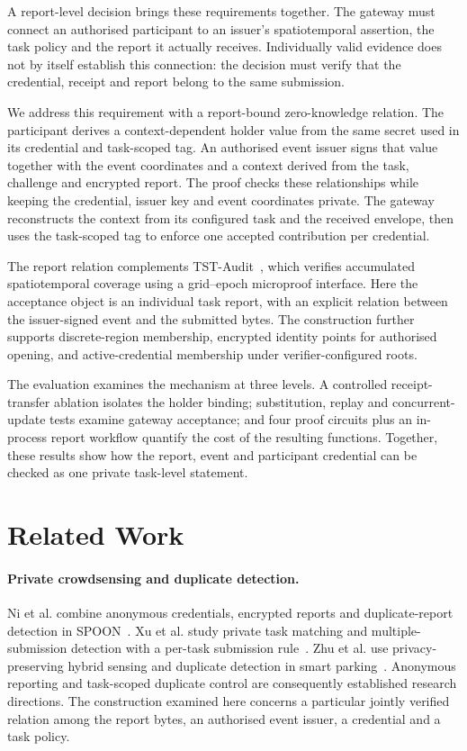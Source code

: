 \documentclass[pdflatex,iicol,sn-mathphys-num]{sn-jnl}
\begin{document}
A report-level decision brings these requirements together. The gateway must connect an authorised participant to an issuer's spatiotemporal assertion, the task policy and the report it actually receives. Individually valid evidence does not by itself establish this connection: the decision must verify that the credential, receipt and report belong to the same submission.

We address this requirement with a report-bound zero-knowledge relation. The participant derives a context-dependent holder value from the same secret used in its credential and task-scoped tag. An authorised event issuer signs that value together with the event coordinates and a context derived from the task, challenge and encrypted report. The proof checks these relationships while keeping the credential, issuer key and event coordinates private. The gateway reconstructs the context from its configured task and the received envelope, then uses the task-scoped tag to enforce one accepted contribution per credential.

The report relation complements TST-Audit~\citep{He2026TSTAudit}, which verifies accumulated spatiotemporal coverage using a grid--epoch microproof interface. Here the acceptance object is an individual task report, with an explicit relation between the issuer-signed event and the submitted bytes. The construction further supports discrete-region membership, encrypted identity points for authorised opening, and active-credential membership under verifier-configured roots.

The evaluation examines the mechanism at three levels. A controlled receipt-transfer ablation isolates the holder binding; substitution, replay and concurrent-update tests examine gateway acceptance; and four proof circuits plus an in-process report workflow quantify the cost of the resulting functions. Together, these results show how the report, event and participant credential can be checked as one private task-level statement.

\section{Related Work}
\paragraph{Private crowdsensing and duplicate detection.} Ni et al. combine anonymous credentials, encrypted reports and duplicate-report detection in SPOON~\citep{Ni2020SPOON}. Xu et al. study private task matching and multiple-submission detection with a per-task submission rule~\citep{Xu2021TaskMatching}. Zhu et al. use privacy-preserving hybrid sensing and duplicate detection in smart parking~\citep{Zhu2022HybridSensing}. Anonymous reporting and task-scoped duplicate control are consequently established research directions. The construction examined here concerns a particular jointly verified relation among the report bytes, an authorised event issuer, a credential and a task policy.
\end{document}
